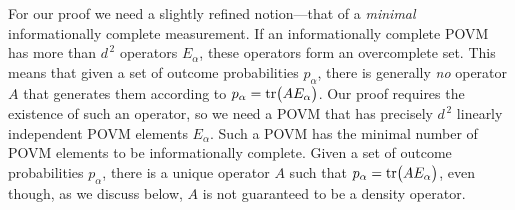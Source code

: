 \documentclass[12pt,aps,eqsecnum]{revtex4-1}
\begin{document}
For our proof we need a slightly refined notion---that of a {\it
minimal\/} informationally complete measurement.  If an
informationally complete POVM has more than $d^{\,2}$ operators
$E_\alpha$, these operators form an overcomplete set.  This means
that given a set of outcome probabilities $p_\alpha$, there is
generally {\it no\/} operator $A$ that generates them according to
$p_\alpha={\rm tr}\big(AE_\alpha\bigr)$.  Our proof requires the
existence of such an operator, so we need a POVM that has
precisely $d^{\,2}$ linearly independent POVM elements $E_\alpha$.
Such a POVM has the minimal number of POVM elements to be
informationally complete.  Given a set of outcome probabilities
$p_\alpha$, there is a unique operator $A$ such that
$p_\alpha={\rm tr}\big(AE_\alpha\bigr)$, even though, as we
discuss below, $A$ is not guaranteed to be a density operator.
\end{document}
